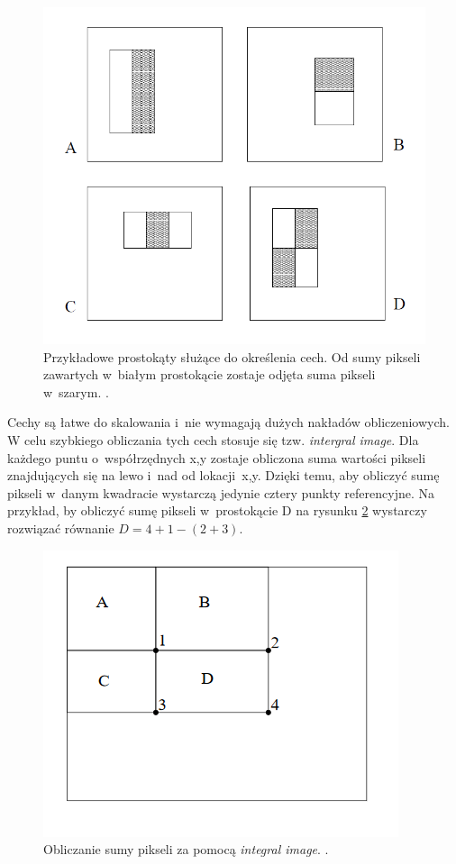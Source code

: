 \begin{enumerate}
\begin{figure}
\centering
\includegraphics[width=0.5\linewidth]{images/haar}
\caption[Falki Harrra.]{Przykładowe prostokąty służące do określenia cech. Od sumy pikseli zawartych w~białym prostokącie zostaje odjęta suma pikseli w~szarym. \cite{viola2001rapid}.}
\label{fig:haar}
\end{figure}
Cechy są łatwe do skalowania i~nie wymagają dużych nakładów obliczeniowych. W celu szybkiego obliczania tych cech stosuje się tzw. \textit{intergral image}. Dla każdego puntu o~współrzędnych x,y zostaje obliczona suma wartości pikseli znajdujących się na lewo i~nad od lokacji~x,y. Dzięki temu, aby obliczyć sumę pikseli w~danym kwadracie wystarczą jedynie cztery punkty referencyjne. Na przykład, by obliczyć sumę pikseli w~prostokącie D na rysunku \ref{fig:integralImage} wystarczy rozwiązać równanie $D = 4 + 1 -(2 + 3)$.

\begin{figure}
\centering
\includegraphics[width=0.5\linewidth]{images/integralImage}
\caption[IntegralImage.]{Obliczanie sumy pikseli za pomocą \textit{integral image}.  \cite{viola2001rapid}.}
\label{fig:integralImage}
\end{figure}


\end{enumerate}
